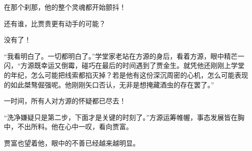 \begin{this_body}
在那个刹那，他的整个灵魂都开始颤抖！

还有谁，比贾贵更有动手的可能？

没有了！

“我看明白了。一切都明白了。”学堂家老站在方源的身后，看着方源，眼中精芒一闪，“方源既幸运又倒霉，碰巧在最后的时间遇到了贾金生。就凭他还刚刚上学堂的年纪，怎么可能把线索都掐灭掉？若是他有这份深沉周密的心机，怎么可能表现的如此桀骜倔强呢。他刚刚矢口否认，无非是想掩藏酒虫的存在罢了。”

一时间，所有人对方源的怀疑都已尽去！

“洗净嫌疑只是第二步，下面才是关键的时刻了。”方源运筹帷幄，事态发展皆在胸中，不出所料。他在心中一叹，看向贾富。

贾富也望着他，眼中的不善已经越来越明显。

\end{this_body}

